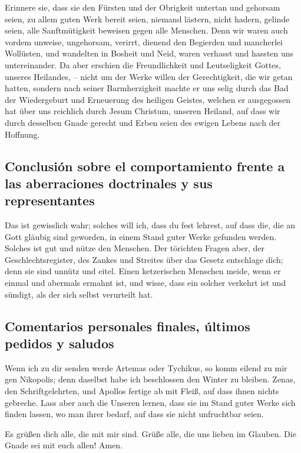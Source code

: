  Erinnere sie, dass sie den Fürsten und der Obrigkeit
untertan und gehorsam seien, zu allem guten Werk bereit seien,
 niemand lästern, nicht hadern, gelinde seien, alle
Sanftmütigkeit beweisen gegen alle Menschen.  Denn wir
waren auch vordem unweise, ungehorsam, verirrt, dienend den Begierden
und mancherlei Wollüsten, und wandelten in Bosheit und Neid, waren
verhasst und hassten uns untereinander.  Da aber erschien
die Freundlichkeit und Leutseligkeit Gottes, unseres Heilandes, --
 nicht um der Werke willen der Gerechtigkeit, die wir
getan hatten, sondern nach seiner Barmherzigkeit machte er uns selig
durch das Bad der Wiedergeburt und Erneuerung des heiligen Geistes,
 welchen er ausgegossen hat über uns reichlich durch Jesum
Christum, unseren Heiland,  auf dass wir durch desselben
Gnade gerecht und Erben seien des ewigen Lebens nach der Hoffnung.

\hypertarget{conclusiuxf3n-sobre-el-comportamiento-frente-a-las-aberraciones-doctrinales-y-sus-representantes}{%
\subsection{Conclusión sobre el comportamiento frente a las aberraciones
doctrinales y sus
representantes}\label{conclusiuxf3n-sobre-el-comportamiento-frente-a-las-aberraciones-doctrinales-y-sus-representantes}}

 Das ist gewisslich wahr; solches will ich, dass du fest
lehrest, auf dass die, die an Gott gläubig sind geworden, in einem Stand
guter Werke gefunden werden. Solches ist gut und nütze den Menschen.
 Der törichten Fragen aber, der Geschlechtsregister, des
Zankes und Streites über das Gesetz entschlage dich; denn sie sind
unnütz und eitel.  Einen ketzerischen Menschen meide,
wenn er einmal und abermals ermahnt ist,  und wisse, dass
ein solcher verkehrt ist und sündigt, als der sich selbst verurteilt
hat.

\hypertarget{comentarios-personales-finales-uxfaltimos-pedidos-y-saludos}{%
\subsection{Comentarios personales finales, últimos pedidos y
saludos}\label{comentarios-personales-finales-uxfaltimos-pedidos-y-saludos}}

 Wenn ich zu dir senden werde Artemas oder Tychikus, so
komm eilend zu mir gen Nikopolis; denn daselbst habe ich beschlossen den
Winter zu bleiben.  Zenas, den Schriftgelehrten, und
Apollos fertige ab mit Fleiß, auf dass ihnen nichts gebreche.
 Lass aber auch die Unseren lernen, dass sie im Stand
guter Werke sich finden lassen, wo man ihrer bedarf, auf dass sie nicht
unfruchtbar seien.

 Es grüßen dich alle, die mit mir sind. Grüße alle, die
uns lieben im Glauben. Die Gnade sei mit euch allen! Amen.

